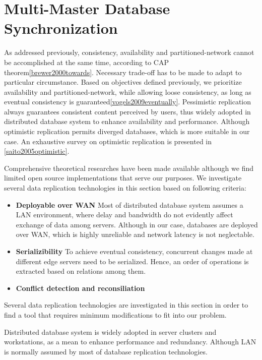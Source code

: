 
\section{Multi-Master Database Synchronization} \label{database_sync}
As addressed previously, consistency, availability and partitioned-network cannot be accomplished at the same time, according to CAP theorem\ref{brewer2000towards}. Necessary trade-off has to be made to adapt to particular circumstance. Based on objectives defined previously, we prioritize availability and partitioned-network, while allowing loose consistency, as long as eventual consistency is guaranteed\ref{vogels2009eventually}. Pessimistic replication always guarantees consistent content perceived by users, thus widely adopted in distributed database system to enhance availability and performance. Although optimistic replication permits diverged databases, which is more suitable in our case. An exhaustive survey on optimistic replication is presented in \ref{saito2005optimistic}.

Comprehensive theoretical researches have been made available although we find limited open source implementations that serve our purposes. We investigate several data replication technologies in this section based on following criteria:
\begin{itemize}
\item \textbf{Deployable over WAN}
Most of distributed database system assumes a LAN environment, where delay and bandwidth do not evidently affect exchange of data among servers. Although in our case, databases are deployed over WAN, which is highly unreliable and network latency is not neglectable.

\item \textbf{Serializibility}
To achieve eventual consistency, concurrent changes made at different edge servers need to be serialized. Hence, an order of operations is extracted based on relations among them.

\item \textbf{Conflict detection and reconsiliation}
\end{itemize}

 Several data replication technologies are investigated in this section in order to find a tool that requires minimum modifications to fit into our problem.

Distributed database system is widely adopted in server clusters and workstations, as a mean to enhance performance and redundancy. Although LAN is normally assumed by most of database replication technologies. 





